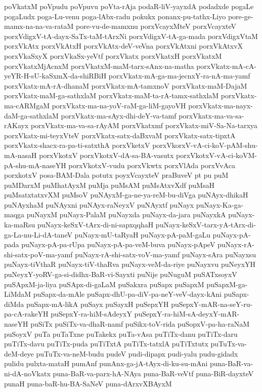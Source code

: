 {poVkatxM
poVpudu
poVpuvu
poVta-rAja
podaR-liV-yayxdA
podadxde
pogaLe
pogaLudx
poga-Lu-venu
poga-lAbx-radu
pokukx
ponanx-pu-tathx-Liyo
pore-ge-mamx-na-na-va-rataM
pore-vu-de-mamxnu
porxVcayxMteV
porxVcayxteV
porxVdigxV-tA-dayx-SaTx-taM-tArxNi
porxVdigxV-tA-ga-mada
porxVdigxVtaM
porxVkAtx
porxVkAtxH
porxVkAtx-deV-veVna
porxVkAtxni
porxVkAtxvX
porxVkaSxyX
porxVkaSx-yeVtf
porxVkatx
porxVkatxH
porxVkatxM
porxVkatxMjAcnxM
porxVkatxM-maM-tarx-sAnx-na-matha
porxVkatx-mA-cA-yeYR-H-sU-kaSxmX-da-shiRBiH
porxVkatx-mA-ga-ma-jecnxY-ra-nA-ma-yamf
porxVkatx-mA-rA-dhanaM
porxVkatx-mA-tamxnoV
porxVkatx-maM-DajaM
porxVkatx-maM-ga-sathxlaM
porxVkatx-maM-ta-rA-tamx-sathxlaM
porxVkatx-ma-cARMgaM
porxVkatx-ma-na-yoV-raM-ga-liM-gayoVH
porxVkatx-ma-nayx-daM-ga-sathxlaM
porxVkatx-ma-sAyx-dhi-deY-va-tamf
porxVkatx-ma-va-sa-rAKayx
porxVkatx-ma-va-sa-rAyAM
porxVkatxmf
porxVkatx-miV-Sa-Na-tarxya
porxVkatx-mi-teyxVteV
porxVkatx-satx-daBxvaM
porxVkatx-satx-tipxtA
porxVkatx-shacx-ra-pa-ti-satxthA
porxVketxV
porxVkorxV-vA-ci-koV-pAM-shu-mA-nasaH
porxVkotxV
porxVkotxV-dA-sa-BA-vasutx
porxVkotxV-vA-ci-koVM-pA-shu-mA-naseYH
porxVkotxV-vudu
porxVkwtx
porxVlAda
porxVvAca
porxkotxV
posa-BAM-Dala
potutx
poyxVcayxteV
praBuveV
pt
pu
puM
puMDarxM
puMhatAyxM
puMja
puMsAM
puMsAtxvXdf
puMsaH
puMsatxtatxvXM
puMsoV
puNAyxM-ga-ne-ya-reM-bu-diVga
puNAyx-dhikaH
puNAyxhaM
puNAyxni
puNAyx-raNeyxV
puNAyxtf
puNayx
puNayx-Ka-ga-maqga
puNayxM
puNayx-PalaM
puNayxda
puNayx-da-jara
puNayxkA
puNayx-ka-maRsu
puNayx-keSxV-tArx-di-ni-sapxqqhaH
puNayx-keSxV-tarx-yA-tArx-di-ga-La-nu-Li-dA-taneV
puNayx-mU-taRyaH
puNayx-pA-paM-gaLu
puNayx-pA-pada
puNayx-pA-pa-rUpa
puNayx-pA-pa-veM-buva
puNayx-pApeV
puNayx-rA-shi-satx-poV-ma-yamf
puNayx-rA-shi-satx-voV-ma-yamf
puNayx-sAra
puNayxsu
puNayx-tiVthaR
puNayx-tiV-thaRva
puNayx-veM-da-riye
puNayxvu
puNeyxYH
puNeyxY-yoRV-ga-si-didhx-BaR-vi-Sayxti
puNije
puNuguM
puSATxsoyxV
puSApxM-ja-liya
puSApx-di-gaLaM
puSakxra
puSapx
puSapxM
puSapxM-ga-LiMdaM
puSapx-da-mAle
puSapx-dhU-pa-diV-pa-neY-veV-dayx-kAni
puSapx-diMda
puSapx-mA-likA
puSayx
puSayxH
puSepxYH
puSepxY-mAR-na-seY-ru-pa-cA-rakeYH
puSepxY-ra-hiM-sAdeyxY
puSepxY-ra-hiM-sA-deyxY-mAR-naseYH
puSiTx
puSiTx-va-dhaR-namf
puSikx-toV-rida
puSopxV-pa-ha-raNaM
puSoyxV
puTa
puTaTxne
puTakekx
puTa-vAsa
puTiTx-danu
puTiTx-daru
puTiTx-davu
puTiTx-puda
puTiTxtA
puTiTx-tatxlA
puTiTxtutx
puTuTx-va-deM-deye
puTuTx-va-neM-budu
pudeV
pudi-dipapx
pudi-yalu
pudu-gidadx
pulidu
pulxta-mataH
pumAnf
punAnx-ga-jA-tAyx-di-ku-su-mAni
puna-BaR-va-ni-dA-noVkatx
puna-BaR-va-parx-hA-NAya
puna-BaR-veVtf
puna-BiR-dayxteV
punaH
puna-baR-hu-BA-SaNeV
puna-dArxvXBAyxM
}

